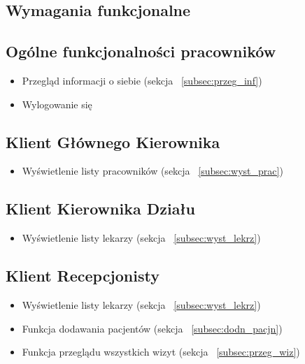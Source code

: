 \begin{flushleft}
\section{\LARGE{Wymagania funkcjonalne}}
\end{flushleft}

\begin{flushleft}
    \subsection{\large{Ogólne funkcjonalności pracowników\label{subsec:gl_kier}}}
    \begin{itemize}
        \item{Przegląd informacji o siebie (sekcja ~\ref{subsec:przeg_inf})}
        \item{Wylogowanie się}
    \end{itemize}
\end{flushleft}

\begin{flushleft}
    \subsection{\large{Klient Głównego Kierownika\label{subsec:gl_kier}}}
    \begin{itemize}
        \item{Wyświetlenie listy pracowników (sekcja ~\ref{subsec:wyst_prac})}
    \end{itemize}
\end{flushleft}

\begin{flushleft}
    \subsection{\large{Klient Kierownika Działu\label{subsec:kier}}}
    \begin{itemize}
        \item{Wyświetlenie listy lekarzy (sekcja ~\ref{subsec:wyst_lekrz})}
    \end{itemize}
\end{flushleft}

\begin{flushleft}
    \subsection{\large{Klient Recepcjonisty\label{subsec:recep}}}
    \begin{itemize}
        \item{Wyświetlenie listy lekarzy (sekcja ~\ref{subsec:wyst_lekrz})}
        \item{Funkcja dodawania pacjentów (sekcja ~\ref{subsec:dodn_pacjn})}
        \item{Funkcja przeglądu wszystkich wizyt (sekcja ~\ref{subsec:przeg_wiz})}
    \end{itemize}
\end{flushleft}

